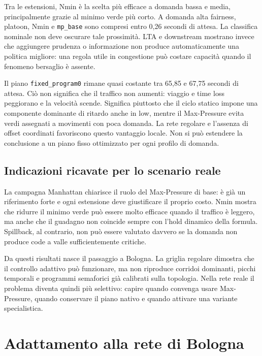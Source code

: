 \documentclass[12pt,a4paper,oneside]{report}
\numberwithin{equation}{chapter}
\newif\ifcapitolifuturi
\begin{document}
Tra le estensioni, Nmin è la scelta più efficace a domanda bassa e media,
principalmente grazie al minimo verde più corto. A domanda alta fairness,
platoon, Nmin e \texttt{mp\_base} sono compresi entro 0,26 secondi di attesa. La classifica
nominale non deve oscurare tale prossimità. LTA e downstream mostrano invece
che aggiungere prudenza o informazione non produce automaticamente una politica
migliore: una regola utile in congestione può costare capacità quando il
fenomeno bersaglio è assente.

Il piano \texttt{fixed\_program0} rimane quasi costante tra 65,85 e 67,75 secondi di attesa. Ciò
non significa che il traffico non aumenti: viaggio e time loss peggiorano e la
velocità scende. Significa piuttosto che il ciclo statico impone una componente dominante
di ritardo anche in low, mentre il Max-Pressure evita verdi assegnati a
movimenti con poca domanda. La rete regolare e l'assenza di offset coordinati
favoriscono questo vantaggio locale. Non si può estendere la conclusione a un
piano fisso ottimizzato per ogni profilo di domanda.

\section{Indicazioni ricavate per lo scenario reale}

La campagna Manhattan chiarisce il ruolo del Max-Pressure di base: è già un
riferimento forte e ogni estensione deve giustificare il proprio costo. Nmin
mostra che ridurre il minimo verde può essere molto efficace quando il traffico
è leggero, ma anche che il guadagno non coincide sempre con l'hold dinamico
della formula. Spillback, al contrario, non può essere valutato davvero se la
domanda non produce code a valle sufficientemente critiche.

Da questi risultati nasce il passaggio a Bologna. La griglia regolare dimostra
che il controllo adattivo può funzionare, ma non riproduce corridoi dominanti,
picchi temporali e programmi semaforici già calibrati sulla topologia. Nella
rete reale il problema diventa quindi più selettivo: capire quando convenga
usare Max-Pressure, quando conservare il piano nativo e quando attivare una
variante specialistica.

\ifcapitolifuturi

\chapter{Adattamento alla rete di Bologna}
\label{chap:bologna-progetto}
\end{document}
